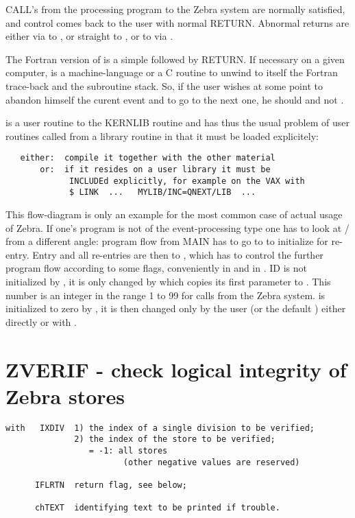 CALL's from the processing program to the Zebra system
are normally satisfied,
and control comes back to the user with normal RETURN.
Abnormal returns are either via  to ,
or straight to ,
or to  via .


The Fortran version of  
is a simple 
followed by RETURN.
If necessary on a given computer,
 is a machine-language or a C routine to unwind to itself
the Fortran trace-back and the subroutine stack.
So, if the user wishes at some point to abandon himself
the curent event and to go to the next one,
he should  and not .

 is a user routine to the KERNLIB routine  and
has thus the usual problem of user routines called
from a library routine in that it must be loaded explicitely:
\begin{verbatim}
   either:  compile it together with the other material
       or:  if it resides on a user library it must be
             INCLUDEd explicitly, for example on the VAX with
             $ LINK  ...   MYLIB/INC=QNEXT/LIB  ...
\end{verbatim} 

This flow-diagram is only an example for the most common case
of actual usage of Zebra.
If one's program is not of the event-processing type
one has to look at / from a different angle:
program flow from MAIN has to go to  to initialize
for re-entry.
Entry and all re-entries are then to ,
which has to control the further program flow according
to some flags,
conveniently  in  and  in .
ID is not initialized by ,
it is only changed by  which copies its first parameter to .
This number is an integer in the range 1 to 99 for calls
from the Zebra system.
 is initialized to zero by ,
it is then changed only by the user (or the default )
either directly or with .

\section{ZVERIF - check logical integrity of Zebra stores}


\begin{verbatim}
with   IXDIV  1) the index of a single division to be verified;
              2) the index of the store to be verified;
                 = -1: all stores
                        (other negative values are reserved)

      IFLRTN  return flag, see below;

      chTEXT  identifying text to be printed if trouble.
\end{verbatim} 

